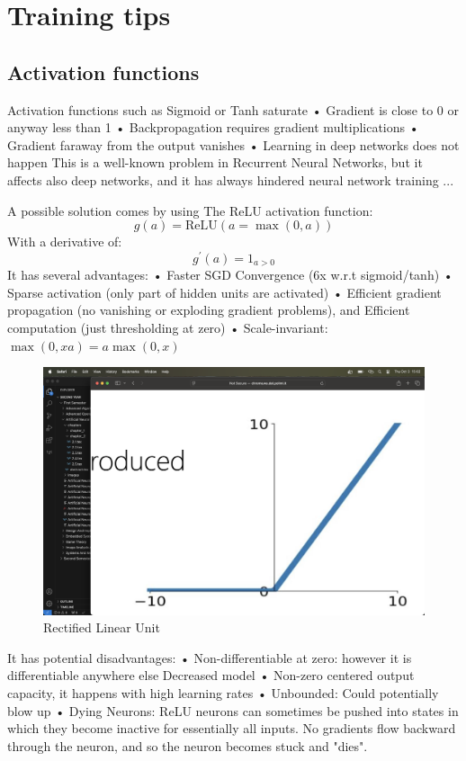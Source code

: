 \section{Training tips}

\subsection{Activation functions}
Activation functions such as Sigmoid or Tanh saturate
• Gradient is close to 0 or anyway less than 1
• Backpropagation requires gradient multiplications
• Gradient faraway from the output vanishes
• Learning in deep networks does not happen
This is a well-known problem in Recurrent Neural Networks, but it affects also deep networks, and it has always hindered neural network training ...

A possible solution comes by using The ReLU activation function: 
\[g(a)=\text{ReLU}(a=\max(0,a))\]
With a derivative of: 
\[g^\prime(a)=1_{a>0}\]
It has several advantages:
• Faster SGD Convergence (6x w.r.t sigmoid/tanh)
• Sparse activation (only part of hidden units are activated)
• Efficient gradient propagation (no vanishing or exploding gradient problems),
and Efficient computation (just thresholding at zero)
• Scale-invariant: $\max(0,xa)=a\max(0,x)$
\begin{figure}[H]
    \centering
    \includegraphics[width=0.75\linewidth]{images/relu.png}
    \caption{Rectified Linear Unit}
\end{figure}
It has potential disadvantages:
• Non-differentiable at zero: however it is differentiable anywhere else
Decreased model
• Non-zero centered output
capacity, it happens with
high learning rates
• Unbounded: Could potentially blow up
• Dying Neurons: ReLU neurons can sometimes be pushed into states in which they become inactive for essentially all inputs. 
  No gradients flow backward through the neuron, and so the neuron becomes stuck and "dies".

